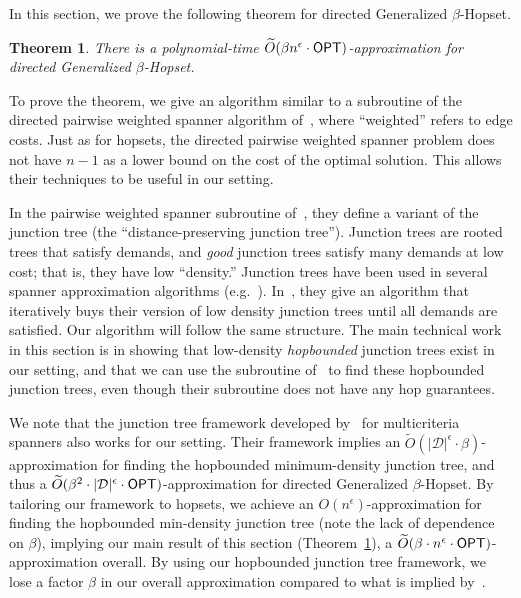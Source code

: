\documentclass{article}
\newtheorem{theorem}{Theorem}[section]
\theoremstyle{definition}
\theoremstyle{remark}
\def\opt {{\sf OPT}}
\def\hopset {{\sc Generalized $\beta$-Hopset}}
\begin{document}
In this section, we prove the following theorem for directed {\hopset}.

\begin{theorem} \label{thm:junction_tree}
    There is a polynomial-time $\widetilde{O} (\beta n^\epsilon \cdot {\opt})$-approximation for directed {\hopset}.
\end{theorem}

To prove the theorem, we give an algorithm similar to a subroutine of the directed pairwise weighted spanner algorithm of~\cite{GKL23}, where ``weighted'' refers to edge costs. Just as for hopsets, the directed pairwise weighted spanner problem does not have $n-1$ as a lower bound on the cost of the optimal solution. This allows their techniques to be useful in our setting. 

In the pairwise weighted spanner subroutine of~\cite{GKL23}, they define a variant of the junction tree (the ``distance-preserving junction tree''). Junction trees are rooted trees that satisfy demands, and \textit{good} junction trees satisfy many demands at low cost; that is, they have low ``density.'' Junction trees have been used in several spanner approximation algorithms (e.g.~\cite{GKL23, CDKL20, GKL24}). In~\cite{GKL23}, they give an algorithm that iteratively buys their version of low density junction trees until all demands are satisfied. Our algorithm will follow the same structure. The main technical work in this section is in showing that low-density \textit{hopbounded} junction trees exist in our setting, and that we can use the subroutine of~\cite{GKL23} to find these hopbounded junction trees, even though their subroutine does not have any hop guarantees.

We note that the junction tree framework developed by~\cite{GKL24} for multicriteria spanners also works for our setting. Their framework implies an $\widetilde{O}(|\mathcal{D}|^\epsilon \cdot \beta)$-approximation for finding the hopbounded minimum-density junction tree, and thus a $\widetilde{O} (\beta^2 \cdot |\mathcal{D}|^\epsilon \cdot {\opt})$-approximation for directed {\hopset}.
By tailoring our framework to hopsets, we achieve an $O(n^\epsilon)$-approximation for finding the hopbounded min-density junction tree (note the lack of dependence on $\beta$), implying our main result of this section (Theorem~\ref{thm:junction_tree}), a $\widetilde{O} (\beta \cdot n^\epsilon \cdot {\opt})$-approximation overall. By using our hopbounded junction tree framework, we lose a factor $\beta$ in our overall approximation compared to what is implied by~\cite{GKL24}.
\end{document}

